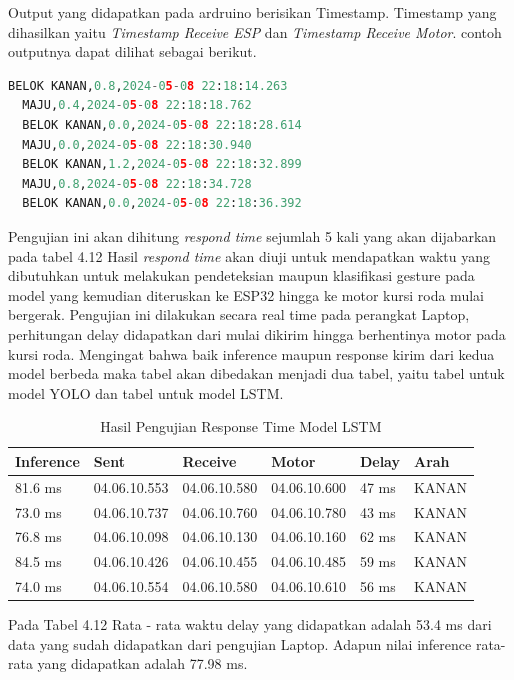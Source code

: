 Output yang didapatkan pada ardruino berisikan Timestamp. Timestamp yang dihasilkan yaitu \emph{Timestamp Receive ESP} dan \emph{Timestamp Receive Motor}. contoh outputnya dapat dilihat sebagai berikut.

\begin{lstlisting}[language=python]
  BELOK KANAN,0.8,2024-05-08 22:18:14.263
  MAJU,0.4,2024-05-08 22:18:18.762
  BELOK KANAN,0.0,2024-05-08 22:18:28.614
  MAJU,0.0,2024-05-08 22:18:30.940
  BELOK KANAN,1.2,2024-05-08 22:18:32.899
  MAJU,0.8,2024-05-08 22:18:34.728
  BELOK KANAN,0.0,2024-05-08 22:18:36.392
\end{lstlisting}

Pengujian ini akan dihitung \emph{respond time} sejumlah 5 kali yang akan dijabarkan pada tabel 4.12 Hasil \emph{respond time} akan diuji untuk mendapatkan waktu yang dibutuhkan untuk melakukan pendeteksian maupun klasifikasi gesture pada model yang kemudian diteruskan ke ESP32 hingga ke motor kursi roda mulai bergerak. Pengujian ini dilakukan secara real time pada perangkat Laptop, perhitungan delay didapatkan dari mulai dikirim hingga berhentinya motor pada kursi roda. Mengingat bahwa baik inference maupun response kirim dari kedua model berbeda maka tabel akan dibedakan menjadi dua tabel, yaitu tabel untuk model YOLO dan tabel untuk model LSTM.

\begin{table}[H]
  \centering
  \label{TabelHasilPengujianResponseTime}
  \caption{Hasil Pengujian Response Time Model LSTM}
  \begin{tabular}{|l|l|l|l|l|l|}
  \hline
  Inference & Sent          & Receive       & Motor         & Delay   & Arah  \\ \hline
  81.6 ms   & 04.06.10.553  & 04.06.10.580  & 04.06.10.600  & 47 ms   & KANAN \\ \hline
  73.0 ms   & 04.06.10.737  & 04.06.10.760  & 04.06.10.780  & 43 ms   & KANAN \\ \hline
  76.8 ms  & 04.06.10.098  & 04.06.10.130  & 04.06.10.160  & 62 ms   & KANAN \\ \hline
  84.5 ms   & 04.06.10.426  & 04.06.10.455  & 04.06.10.485  & 59 ms   & KANAN \\ \hline
  74.0 ms   & 04.06.10.554  & 04.06.10.580  & 04.06.10.610  & 56 ms   & KANAN \\ \hline
  \end{tabular}
\end{table}

Pada Tabel 4.12 Rata - rata waktu delay yang didapatkan adalah 53.4 ms dari data yang sudah didapatkan dari pengujian Laptop. Adapun nilai inference rata-rata yang didapatkan adalah 77.98 ms.

